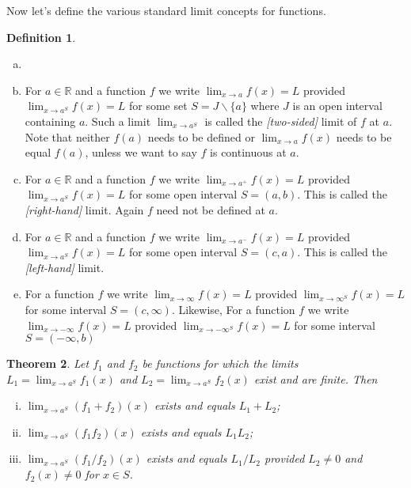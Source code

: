 \documentclass[12pt, lettersize]{book}
\theoremstyle{plain}
\newtheorem{thm}{Theorem}[section]
\theoremstyle{definition}
\newtheorem{dfn}[thm]{Definition}
\theoremstyle{remark}
\newcommand{\R}{\mathbb{R}}
\begin{document}
		Now let's define the various standard limit concepts for functions.
		\begin{dfn}
			\begin{enumerate}[(a)]
				\item[]
				\item For $a\in\R$ and a function $f$ we write $\lim_{x\rightarrow a}f(x)=L$ provided $\lim_{x\rightarrow a^S}f(x)=L$ for some set $S=J\backslash\{a\}$ where $J$ is an open interval containing $a$. Such a limit 
				$\lim_{x\rightarrow a^S}$ is called the \emph{[two-sided]} limit of $f$ at $a$. Note that neither $f(a)$ needs to be defined or $\lim_{x\rightarrow a}f(x)$ needs to be equal $f(a)$, unless we want to say $f$ is continuous at $a$.
				\item For $a\in\R$ and a function $f$ we write $\lim_{x\rightarrow a^+}f(x)=L$ provided $\lim_{x\rightarrow a^S}f(x)=L$ for some open interval $S=(a,b)$. This is called the \emph{[right-hand]} limit. Again $f$ need not
				be defined at $a$.
				\item For $a\in\R$ and a function $f$ we write $\lim_{x\rightarrow a^-}f(x)=L$ provided $\lim_{x\rightarrow a^S}f(x)=L$ for some open interval $S=(c,a)$. This is called the \emph{[left-hand]} limit.
				\item For a function $f$ we write $\lim_{x\rightarrow\infty}f(x)=L$ provided $\lim_{x\rightarrow\infty^S}f(x)=L$ for some interval $S=(c,\infty)$. Likewise, For a function $f$ we write $\lim_{x\rightarrow-\infty}f(x)=L$ provided $\lim_{x\rightarrow-\infty^S}f(x)=L$ for some interval $S=(-\infty,b)$
			\end{enumerate} 
		\end{dfn}
		
		\begin{thm}\label{def:20.4}
			Let $f_1$ and $f_2$ be functions for which the limits $L_1=\lim_{x\rightarrow a^S}f_1(x)$ and $L_2=\lim_{x\rightarrow a^S}f_2(x)$ exist and are finite. Then
			\begin{enumerate}[(i)]
				\item $\lim_{x\rightarrow a^S}(f_1+f_2)(x)$ exists and equals $L_1+L_2$;
				\item $\lim_{x\rightarrow a^S}(f_1f_2)(x)$ exists and equals $L_1L_2$;
				\item $\lim_{x\rightarrow a^S}(f_1/f_2)(x)$ exists and equals $L_1/L_2$ provided $L_2\neq0$ and $f_2(x)\neq0$ for $x\in S$.
			\end{enumerate}
		\end{thm}
		
\end{document}
